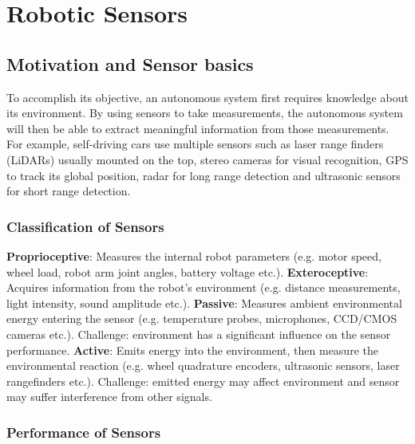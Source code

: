 \section{Robotic Sensors}

\subsection{Motivation and Sensor basics}
To accomplish its objective, an autonomous system first requires knowledge about its environment. By using sensors to take measurements, the autonomous system will then be able to extract meaningful information from those measurements. For example, self-driving cars use multiple sensors such as laser range finders (LiDARs) usually mounted on the top, stereo cameras for visual recognition, GPS to track its global position, radar for long range detection and ultrasonic sensors for short range detection.
\subsubsection{Classification of Sensors}

\textbf{Proprioceptive}: Measures the internal robot parameters (e.g. motor speed, wheel load, robot arm joint angles, battery voltage etc.). \newline \newline
\textbf{Exteroceptive}: Acquires information from the robot's environment (e.g. distance measurements, light intensity, sound amplitude etc.). \newline \newline
\textbf{Passive}: Measures ambient environmental energy entering the sensor (e.g. temperature probes, microphones, CCD/CMOS cameras etc.). Challenge: environment has a significant influence on the sensor performance.\newline \newline
\textbf{Active}: Emits energy into the environment, then measure the environmental reaction (e.g. wheel quadrature encoders, ultrasonic sensors, laser rangefinders etc.). Challenge: emitted energy may affect environment and sensor may suffer interference from other signals.


\subsubsection{Performance of Sensors}


